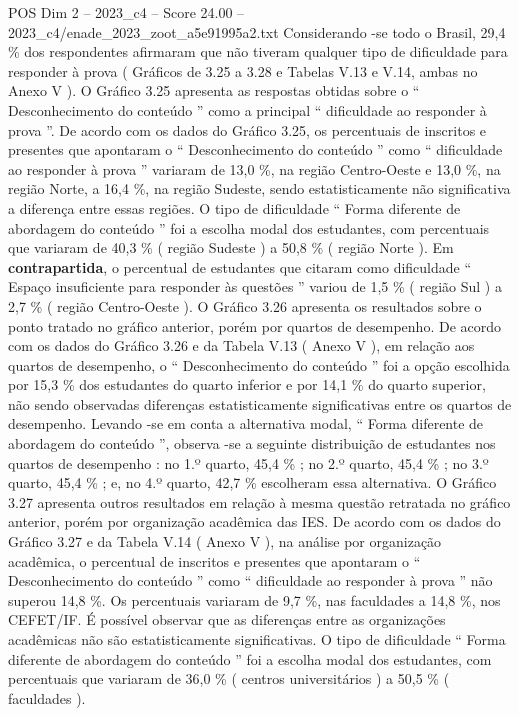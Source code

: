 \begin{textsample}{POS Dim 2 – 2023\_c4 – Score 24.00 – 2023\_c4/enade\_2023\_zoot\_a5e91995a2.txt}
Considerando -se todo o Brasil, 29,4 \% dos respondentes afirmaram que não tiveram qualquer tipo de dificuldade para responder à prova ( Gráficos de 3.25 a 3.28 e Tabelas V.13 e V.14, ambas no Anexo V ).
O Gráfico 3.25 apresenta as respostas obtidas sobre o “ Desconhecimento do conteúdo ” como a principal “ dificuldade ao responder à prova ”.
De acordo com os dados do Gráfico 3.25, os percentuais de inscritos e presentes que apontaram o “ Desconhecimento do conteúdo ” como “ dificuldade ao responder à prova ” variaram de 13,0 \%, na região Centro-Oeste e 13,0 \%, na região Norte, a 16,4 \%, na região Sudeste, sendo estatisticamente não significativa a diferença entre essas regiões.
O tipo de dificuldade “ Forma diferente de abordagem do conteúdo ” foi a escolha modal dos estudantes, com percentuais que variaram de 40,3 \% ( região Sudeste ) a 50,8 \% ( região Norte ).
Em \textbf{contrapartida}, o percentual de estudantes que citaram como dificuldade “ Espaço insuficiente para responder às questões ” variou de 1,5 \% ( região Sul ) a 2,7 \% ( região Centro-Oeste ).
O Gráfico 3.26 apresenta os resultados sobre o ponto tratado no gráfico anterior, porém por quartos de desempenho.
De acordo com os dados do Gráfico 3.26 e da Tabela V.13 ( Anexo V ), em relação aos quartos de desempenho, o “ Desconhecimento do conteúdo ” foi a opção escolhida por 15,3 \% dos estudantes do quarto inferior e por 14,1 \% do quarto superior, não sendo observadas diferenças estatisticamente significativas entre os quartos de desempenho.
Levando -se em conta a alternativa modal, “ Forma diferente de abordagem do conteúdo ”, observa -se a seguinte distribuição de estudantes nos quartos de desempenho : no 1.º quarto, 45,4 \% ; no 2.º quarto, 45,4 \% ; no 3.º quarto, 45,4 \% ; e, no 4.º quarto, 42,7 \% escolheram essa alternativa.
O Gráfico 3.27 apresenta outros resultados em relação à mesma questão retratada no gráfico anterior, porém por organização acadêmica das IES.
De acordo com os dados do Gráfico 3.27 e da Tabela V.14 ( Anexo V ), na análise por organização acadêmica, o percentual de inscritos e presentes que apontaram o “ Desconhecimento do conteúdo ” como “ dificuldade ao responder à prova ” não superou 14,8 \%.
Os percentuais variaram de 9,7 \%, nas faculdades a 14,8 \%, nos CEFET/IF.
É possível observar que as diferenças entre as organizações acadêmicas não são estatisticamente significativas.
O tipo de dificuldade “ Forma diferente de abordagem do conteúdo ” foi a escolha modal dos estudantes, com percentuais que variaram de 36,0 \% ( centros universitários ) a 50,5 \% ( faculdades ).

\end{textsample}
